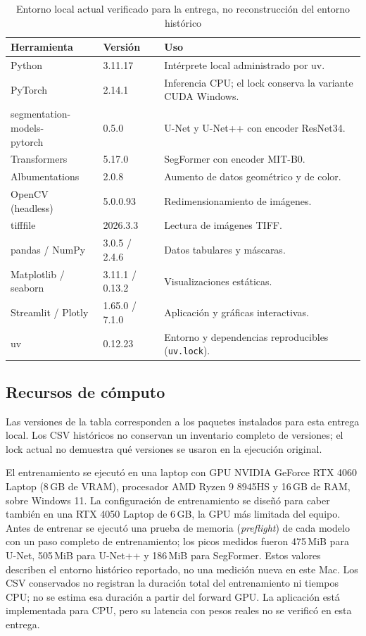 \documentclass[11pt,letterpaper]{article}
\begin{document}
\begin{table}[H]
\centering
\caption{Entorno local actual verificado para la entrega, no reconstrucción del entorno histórico}
\begin{tabular}{llp{8.2cm}}
\toprule
\textbf{Herramienta} & \textbf{Versión} & \textbf{Uso} \\
\midrule
Python                        & 3.11.17 & Intérprete local administrado por uv. \\
PyTorch                       & 2.14.1 & Inferencia CPU; el lock conserva la variante CUDA Windows. \\
\shortstack[l]{segmentation-models-\\pytorch} & 0.5.0 & U-Net y U-Net++ con encoder ResNet34. \\
Transformers                  & 5.17.0 & SegFormer con encoder MIT-B0. \\
Albumentations                & 2.0.8 & Aumento de datos geométrico y de color. \\
OpenCV (headless)             & 5.0.0.93 & Redimensionamiento de imágenes. \\
tifffile                      & 2026.3.3 & Lectura de imágenes TIFF. \\
pandas / NumPy                & 3.0.5 / 2.4.6 & Datos tabulares y máscaras. \\
Matplotlib / seaborn          & 3.11.1 / 0.13.2 & Visualizaciones estáticas. \\
Streamlit / Plotly            & 1.65.0 / 7.1.0 & Aplicación y gráficas interactivas. \\
uv                            & 0.12.23 & Entorno y dependencias reproducibles (\texttt{uv.lock}). \\
\bottomrule
\end{tabular}
\end{table}

\subsection{Recursos de cómputo}

Las versiones de la tabla corresponden a los paquetes instalados para esta entrega local. Los
CSV históricos no conservan un inventario completo de versiones; el lock actual no demuestra qué
versiones se usaron en la ejecución original.

El entrenamiento se ejecutó en una laptop con GPU NVIDIA GeForce RTX 4060 Laptop (8\,GB de VRAM),
procesador AMD Ryzen 9 8945HS y 16\,GB de RAM, sobre Windows 11. La configuración de entrenamiento
se diseñó para caber también en una RTX 4050 Laptop de 6\,GB, la GPU más limitada del equipo. Antes
de entrenar se ejecutó una prueba de memoria (\emph{preflight}) de cada modelo con un paso completo de
entrenamiento; los picos medidos fueron 475\,MiB para U-Net, 505\,MiB para U-Net++ y 186\,MiB para
SegFormer. Estos valores describen el entorno histórico reportado, no una medición nueva en este
Mac. Los CSV conservados no registran la duración total del entrenamiento ni tiempos CPU; no se
estima esa duración a partir del forward GPU. La aplicación está implementada para CPU, pero su
latencia con pesos reales no se verificó en esta entrega.
\end{document}
